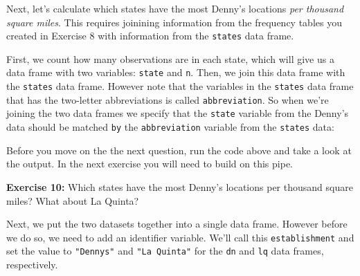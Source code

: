 \documentclass[]{book}
\newenvironment{Shaded}{\begin{snugshade}}{\end{snugshade}}
\newcommand{\KeywordTok}[1]{\textcolor[rgb]{0.13,0.29,0.53}{\textbf{#1}}}
\newcommand{\DataTypeTok}[1]{\textcolor[rgb]{0.13,0.29,0.53}{#1}}
\newcommand{\StringTok}[1]{\textcolor[rgb]{0.31,0.60,0.02}{#1}}
\newcommand{\OperatorTok}[1]{\textcolor[rgb]{0.81,0.36,0.00}{\textbf{#1}}}
\newcommand{\NormalTok}[1]{#1}
\theoremstyle{definition}
\theoremstyle{definition}
\theoremstyle{definition}
\theoremstyle{remark}
\begin{document}
Next, let's calculate which states have the most Denny's locations
\emph{per thousand square miles}. This requires joinining information
from the frequency tables you created in Exercise 8 with information
from the \texttt{states} data frame.

First, we count how many observations are in each state, which will give
us a data frame with two variables: \texttt{state} and \texttt{n}. Then,
we join this data frame with the \texttt{states} data frame. However
note that the variables in the \texttt{states} data frame that has the
two-letter abbreviations is called \texttt{abbreviation}. So when we're
joining the two data frames we specify that the \texttt{state} variable
from the Denny's data should be matched \texttt{by} the
\texttt{abbreviation} variable from the \texttt{states} data:

\begin{Shaded}
\end{Shaded}

Before you move on the the next question, run the code above and take a
look at the output. In the next exercise you will need to build on this
pipe.

\textbf{Exercise 10:} Which states have the most Denny's locations per
thousand square miles? What about La Quinta?

Next, we put the two datasets together into a single data frame. However
before we do so, we need to add an identifier variable. We'll call this
\texttt{establishment} and set the value to
\texttt{"Denny\textquotesingle{}s"} and \texttt{"La\ Quinta"} for the
\texttt{dn} and \texttt{lq} data frames, respectively.

\begin{Shaded}
\end{Shaded}
\end{document}
